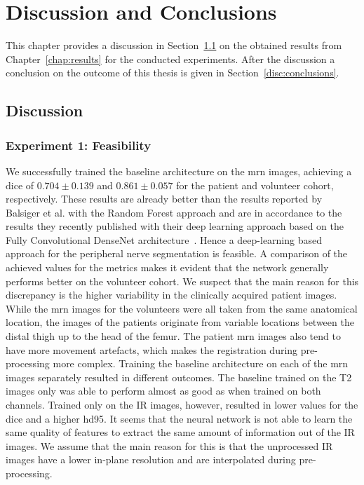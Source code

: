 \chapter{Discussion and Conclusions}
This chapter provides a discussion in Section~\ref{disc:discussion} on the obtained results from Chapter~\ref{chap:results} for the conducted experiments. After the discussion a conclusion on the outcome of this thesis is given in Section~\ref{disc:conclusions}.

\section{Discussion} \label{disc:discussion}
\subsection{Experiment 1: Feasibility}
We successfully trained the baseline architecture on the \gls{mrn} images, achieving a \acrlong{dice} of $0.704 \pm 0.139$ and $0.861 \pm 0.057$ for the patient and volunteer cohort, respectively. These results are already better than the results reported by Balsiger et al. \cite{Balsiger2016DevelopmentApproaches} with the Random Forest approach and are in accordance to the results they recently published \cite{BalsigerContext-awareNeurography} with their deep learning approach based on the Fully Convolutional DenseNet architecture~\cite{Jegou2017TheSegmentation}. Hence a deep-learning based approach for the peripheral nerve segmentation is feasible.
A comparison of the achieved values for the metrics makes it evident that the network generally performs better on the volunteer cohort. We suspect that the main reason for this discrepancy is the higher variability in the clinically acquired patient images. While the \gls{mrn} images for the volunteers were all taken from the same anatomical location, the images of the patients originate from variable locations between the distal thigh up to the head of the femur. The patient \gls{mrn} images also tend to have more movement artefacts, which makes the registration during pre-processing more complex.
Training the baseline architecture on each of the \gls{mrn} images separately resulted in different outcomes. The baseline trained on the T2 images only was able to perform almost as good as when trained on both channels. Trained only on the IR images, however, resulted in lower values for the \acrlong{dice} and a higher \acrlong{hd95}. It seems that the neural network is not able to learn the same quality of features to extract the same amount of information out of the IR images. We assume that the main reason for this is that the unprocessed IR images have a lower in-plane resolution and are interpolated during pre-processing.
